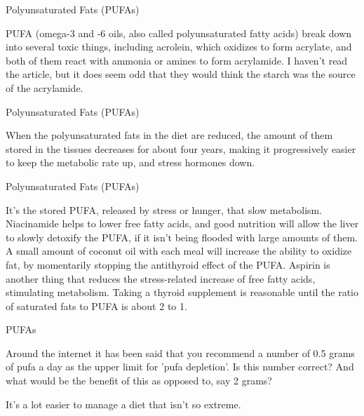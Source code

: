 \documentclass[11pt,oneside,openany,extrafontsizes]{memoir}
\begin{document}
\begin{standalonequote}{Polyunsaturated Fats (PUFAs)}

    \begin{answer}
        PUFA (omega-3 and -6 oils, also called polyunsaturated fatty acids) break down into several toxic things, including acrolein, which oxidizes to form acrylate, and both of them react with ammonia or amines to form acrylamide. I haven't read the article, but it does seem odd that they would think the starch was the source of the acrylamide.
    \end{answer}
\end{standalonequote}

\begin{standalonequote}{Polyunsaturated Fats (PUFAs)}

    \begin{answer}
        When the polyunsaturated fats in the diet are reduced, the amount of them stored in the tissues decreases for about four years, making it progressively easier to keep the metabolic rate up, and stress hormones down.
    \end{answer}
\end{standalonequote}

\begin{standalonequote}{Polyunsaturated Fats (PUFAs)}

    \begin{answer}
        It's the stored PUFA, released by stress or hunger, that slow metabolism. Niacinamide helps to lower free fatty acids, and good nutrition will allow the liver to slowly detoxify the PUFA, if it isn't being flooded with large amounts of them. A small amount of coconut oil with each meal will increase the ability to oxidize fat, by momentarily stopping the antithyroid effect of the PUFA. Aspirin is another thing that reduces the stress-related increase of free fatty acids, stimulating metabolism. Taking a thyroid supplement is reasonable until the ratio of saturated fats to PUFA is about 2 to 1.
    \end{answer}
\end{standalonequote}

\begin{qaexchange}{PUFAs}

    \begin{question}
        Around the internet it has been said that you recommend a number of 0.5 grams of pufa a day as the upper limit for 'pufa depletion'. Is this number correct? And what would be the benefit of this as opposed to, say 2 grams?
    \end{question}

    \begin{answer}
        It's a lot easier to manage a diet that isn't so extreme.
    \end{answer}
\end{qaexchange}
\end{document}
